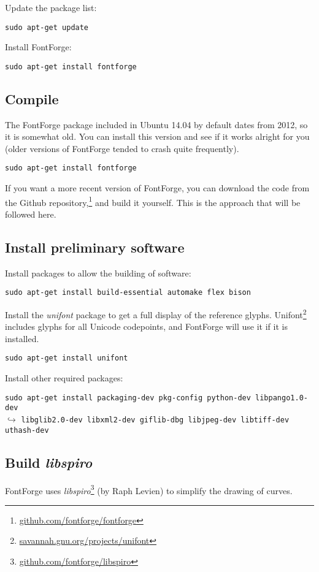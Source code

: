 Update the package list:

\verb|sudo apt-get update|

Install FontForge:

\verb|sudo apt-get install fontforge|

\subsection{Compile}

The FontForge package included in Ubuntu 14.04 by default dates from 2012, so it is somewhat old.  You can install this version and see if it works alright for you (older versions of FontForge tended to crash quite frequently).

\verb|sudo apt-get install fontforge|

If you want a more recent version of FontForge, you can download the code from the Github repository,\footnote{\url{github.com/fontforge/fontforge}} and build it yourself.  This is the approach that will be followed here.

\subsection{Install preliminary software}

Install packages to allow the building of software:

\verb|sudo apt-get install build-essential automake flex bison|

Install the \textit{unifont} package to get a full display of the reference glyphs.  Unifont\footnote{\url{savannah.gnu.org/projects/unifont}} includes glyphs for all Unicode codepoints, and FontForge will use it if it is installed.

\verb|sudo apt-get install unifont|

Install other required packages: 

\verb|sudo apt-get install packaging-dev pkg-config python-dev libpango1.0-dev|\\
$\hookrightarrow$ \verb|libglib2.0-dev libxml2-dev giflib-dbg libjpeg-dev libtiff-dev uthash-dev|

\subsection{Build \textit{libspiro}}

FontForge uses \textit{libspiro}\footnote{\url{github.com/fontforge/libspiro}} (by Raph Levien) to simplify the drawing of curves.

